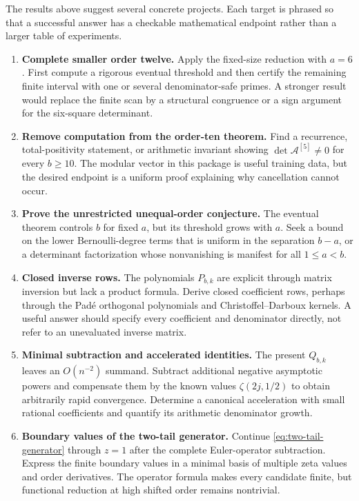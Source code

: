 \documentclass[11pt]{article}
\theoremstyle{definition}
\newcommand{\A}{\mathcal{A}}
\begin{document}
The results above suggest several concrete projects.  Each target is
phrased so that a successful answer has a checkable mathematical
endpoint rather than a larger table of experiments.

\begin{enumerate}[label=\textbf{R\arabic*.},leftmargin=*]
\item \textbf{Complete smaller order twelve.}
Apply the fixed-size reduction with $a=6$.  First compute a rigorous
eventual threshold and then certify the remaining finite interval with
one or several denominator-safe primes.  A stronger result would replace
the finite scan by a structural congruence or a sign argument for the
six-square determinant.

\item \textbf{Remove computation from the order-ten theorem.}
Find a recurrence, total-positivity statement, or arithmetic invariant
showing $\det\A^{[5]}\ne0$ for every $b\ge10$.  The modular vector in
this package is useful training data, but the desired endpoint is a
uniform proof explaining why cancellation cannot occur.

\item \textbf{Prove the unrestricted unequal-order conjecture.}
The eventual theorem controls $b$ for fixed $a$, but its threshold grows
with $a$.  Seek a bound on the lower Bernoulli-degree terms that is
uniform in the separation $b-a$, or a determinant factorization whose
nonvanishing is manifest for all $1\le a<b$.

\item \textbf{Closed inverse rows.}
The polynomials $P_{b,k}$ are explicit through matrix inversion but lack
a product formula.  Derive closed coefficient rows, perhaps through the
Pad\'e orthogonal polynomials and Christoffel--Darboux kernels.  A useful
answer should specify every coefficient and denominator directly, not
refer to an unevaluated inverse matrix.

\item \textbf{Minimal subtraction and accelerated identities.}
The present $Q_{b,k}$ leaves an $O(n^{-2})$ summand.  Subtract additional
negative asymptotic powers and compensate them by the known values
$\zeta(2j,1/2)$ to obtain arbitrarily rapid convergence.  Determine a
canonical acceleration with small rational coefficients and quantify
its arithmetic denominator growth.

\item \textbf{Boundary values of the two-tail generator.}
Continue \eqref{eq:two-tail-generator} through $z=1$ after the complete
Euler-operator subtraction.  Express the finite boundary values in a
minimal basis of multiple zeta values and order derivatives.  The
operator formula makes every candidate finite, but functional reduction
at high shifted order remains nontrivial.


\end{enumerate}
\end{document}
